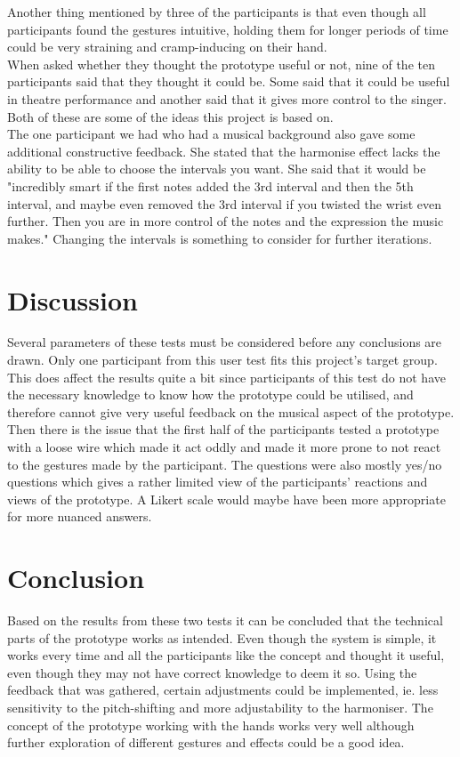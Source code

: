 Another thing mentioned by three of the participants is that even though all participants found the gestures intuitive, holding them for longer periods of time could be very straining and cramp-inducing on their hand. \\

When asked whether they thought the prototype useful or not, nine of the ten participants said that they thought it could be. Some said that it could be useful in theatre performance and another said that it gives more control to the singer. Both of these are some of the ideas this project is based on. \\

The one participant we had who had a musical background also gave some additional constructive feedback. She stated that the harmonise effect lacks the ability to be able to choose the intervals you want. She said that it would be "incredibly smart if the first notes added the 3rd interval and then the 5th interval, and maybe even removed the 3rd interval if you twisted the wrist even further. Then you are in more control of the notes and the expression the music makes." Changing the intervals is something to consider for further iterations. 

\section{Discussion}
Several parameters of these tests must be considered before any conclusions are drawn. Only one participant from this user test fits this project's target group. This does affect the results quite a bit since participants of this test  do not have the necessary knowledge to know how the prototype could be utilised, and therefore cannot give very useful feedback on the musical aspect of the prototype.
Then there is the issue that the first half of the participants tested a prototype with a loose wire which made it act oddly and made it more prone to not react to the gestures made by the participant. The questions were also mostly yes/no questions which gives a rather limited view of the participants' reactions and views of the prototype. A Likert scale would maybe have been more appropriate for more nuanced answers.

\section{Conclusion}
Based on the results from these two tests it can be concluded that the technical parts of the prototype works as intended. Even though the system is simple, it works every time and all the participants like the concept and thought it useful, even though they may not have correct knowledge to deem it so. Using the feedback that was gathered, certain adjustments could be implemented, ie. less sensitivity to the pitch-shifting and more adjustability to the harmoniser. The concept of the prototype working with the hands works very well although further exploration of different gestures and effects could be a good idea. 


